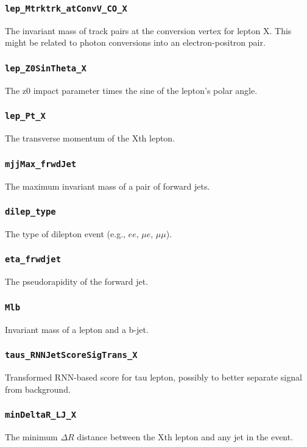 \subsubsection{\texttt{lep\_Mtrktrk\_atConvV\_CO\_X}} The invariant mass of track pairs at the conversion vertex for lepton
X. This might be related to photon conversions into an electron-positron pair.

\subsubsection{\texttt{lep\_Z0SinTheta\_X}} The z0 impact parameter times the sine of the lepton's polar angle.

\subsubsection{\texttt{lep\_Pt\_X}} The transverse momentum of the Xth lepton.

\subsubsection{\texttt{mjjMax\_frwdJet}} The maximum invariant mass of a pair of forward jets.

\subsubsection{\texttt{dilep\_type}} The type of dilepton event (e.g., $ee$, $\mu e$, $\mu \mu$).

\subsubsection{\texttt{eta\_frwdjet}} The pseudorapidity of the forward jet.

\subsubsection{\texttt{Mlb}} Invariant mass of a lepton and a b-jet.

\subsubsection{\texttt{taus\_RNNJetScoreSigTrans\_X}} Transformed RNN-based score for tau lepton, possibly to better
separate signal from background.

\subsubsection{\texttt{minDeltaR\_LJ\_X}} The minimum $\Delta R$ distance between the Xth lepton and any jet in the event.

